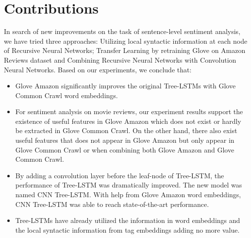 \section{Contributions}
In search of new improvements on the task of sentence-level sentiment analysis, we have tried three approaches: Utilizing local syntactic information at each node of Recursive Neural Networks; Transfer Learning by retraining Glove on Amazon Reviews dataset and Combining Recursive Neural Networks with Convolution Neural Networks.
Based on our experiments, we conclude that:
\begin{itemize}
\item Glove Amazon significantly improves the original Tree-LSTMs with Glove Common Crawl word embeddings.

\item For sentiment analysis on movie reviews, our experiment results support the existence of useful features in Glove Amazon which does not exist or hardly be extracted in Glove Common Crawl.
On the other hand, there also exist useful features that does not appear in Glove Amazon but only appear in Glove Common Crawl or when combining both Glove Amazon and Glove Common Crawl.

\item By adding a convolution layer before the leaf-node of Tree-LSTM, the performance of Tree-LSTM was dramatically improved.
The new model was named CNN Tree-LSTM. 
With help from Glove Amazon word embeddings, CNN Tree-LSTM was able to reach state-of-the-art performance.

\item  Tree-LSTMs have already utilized the information in word embeddings and the local syntactic information from tag embeddings adding no more value.
\end{itemize}

